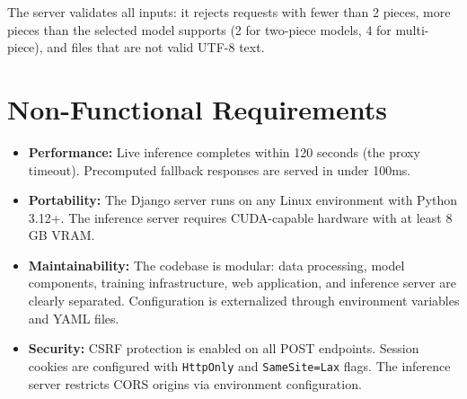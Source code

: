 The server validates all inputs: it rejects requests with fewer than 2 pieces, more pieces than the selected model supports (2 for two-piece models, 4 for multi-piece), and files that are not valid UTF-8 text.

\section{Non-Functional Requirements}

\begin{itemize}
    \item \textbf{Performance:} Live inference completes within 120 seconds (the proxy timeout). Precomputed fallback responses are served in under 100ms.
    \item \textbf{Portability:} The Django server runs on any Linux environment with Python 3.12+. The inference server requires CUDA-capable hardware with at least 8 GB VRAM.
    \item \textbf{Maintainability:} The codebase is modular: data processing, model components, training infrastructure, web application, and inference server are clearly separated. Configuration is externalized through environment variables and YAML files.
    \item \textbf{Security:} CSRF protection is enabled on all POST endpoints. Session cookies are configured with \texttt{HttpOnly} and \texttt{SameSite=Lax} flags. The inference server restricts CORS origins via environment configuration.
\end{itemize}
